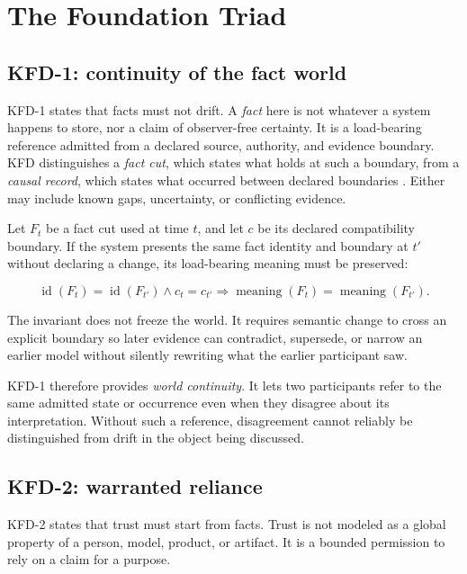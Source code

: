 \section{The Foundation Triad}
\label{sec:foundation}

\subsection{KFD-1: continuity of the fact world}

KFD-1 states that facts must not drift. A \emph{fact} here is not whatever a
system happens to store, nor a claim of observer-free certainty. It is a
load-bearing reference admitted from a declared source, authority, and
evidence boundary. KFD distinguishes a \emph{fact cut}, which states what
holds at such a boundary, from a \emph{causal record}, which states what
occurred between declared boundaries \cite{kfd2026alpha42}. Either may include
known gaps, uncertainty, or conflicting evidence.

Let $F_t$ be a fact cut used at time $t$, and let $c$ be its declared
compatibility boundary. If the system presents the same fact identity and
boundary at $t'$ without declaring a change, its load-bearing meaning must be
preserved:

\begin{equation}
\operatorname{id}(F_t)=\operatorname{id}(F_{t'}) \land c_t=c_{t'}
\Longrightarrow
\operatorname{meaning}(F_t)=\operatorname{meaning}(F_{t'}).
\label{eq:fact-continuity}
\end{equation}

The invariant does not freeze the world. It requires semantic change to cross
an explicit boundary so later evidence can contradict, supersede, or narrow an
earlier model without silently rewriting what the earlier participant saw.

KFD-1 therefore provides \emph{world continuity}. It lets two participants
refer to the same admitted state or occurrence even when they disagree about
its interpretation. Without such a reference, disagreement cannot reliably
be distinguished from drift in the object being discussed.

\subsection{KFD-2: warranted reliance}

KFD-2 states that trust must start from facts. Trust is not modeled as a
global property of a person, model, product, or artifact. It is a bounded
permission to rely on a claim for a purpose.

